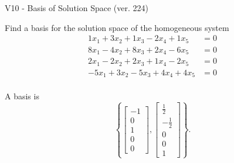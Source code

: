 \begin{exercise}
  \begin{exerciseTitle}V10 - Basis of Solution Space (ver. 224)\end{exerciseTitle}
  \begin{exerciseStatement}
    Find a basis for the solution space of the homogeneous system 
\begin{align*}
 1 x_ 1 + 3 x_ 2 + 1 x_ 3 -2 x_ 4 + 1 x_ 5 &= 0  \\ 
  8 x_ 1 -4 x_ 2 + 8 x_ 3 + 2 x_ 4 -6 x_ 5 &= 0  \\ 
  2 x_ 1 -2 x_ 2 + 2 x_ 3 + 1 x_ 4 -2 x_ 5 &= 0  \\ 
  -5 x_ 1 + 3 x_ 2 -5 x_ 3 + 4 x_ 4 + 4 x_ 5 &= 0  \\ 
 \end{align*}


 
  \end{exerciseStatement}

  \begin{exerciseAnswer}
   A basis is   
\[\left\{\left[\begin{array}{c}
-1 \\
0 \\
1 \\
0 \\
0
\end{array}\right] , \left[\begin{array}{c}
\frac{1}{2} \\
-\frac{1}{2} \\
0 \\
0 \\
1
\end{array}\right]\right\}.\]

  


  \end{exerciseAnswer}
\end{exercise}